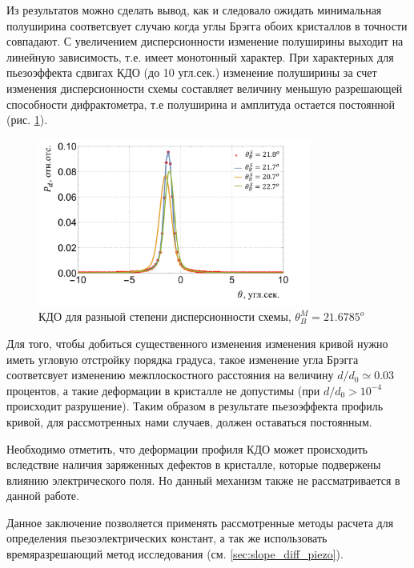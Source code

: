 Из результатов можно сделать вывод, как и следовало ожидать минимальная полуширина соответсвует
случаю когда углы Брэгга обоих кристаллов в точности совпадают. С увеличением
дисперсионности изменение полуширины выходит на линейную зависимость, т.е.
имеет монотонный характер. При характерных для пьезоэффекта сдвигах КДО (до 10 угл.сек.)
изменение полуширины за счет изменения дисперсионности схемы составляет
величину меньшую разрешающей способности дифрактометра, т.е полуширина и
амплитуда остается постоянной
 (рис. \ref{ris:FWHM_diference_bragg_KDO}).

\begin{figure}[H]
  \centering
  \includegraphics[width=0.8\textwidth]{images/FWHM_diference_bragg_KDO.png}
  \caption{КДО для разныой степени дисперсионности схемы, $\theta_B^M = 21.6785 ^o$}
  \label{ris:FWHM_diference_bragg_KDO}
\end{figure}

Для того, чтобы добиться существенного изменения изменения кривой нужно
иметь угловую отстройку порядка градуса, такое изменение угла Брэгга
соответсвует изменению межплоскостного расстояния на величину $d/d_0 \simeq 0.03$
процентов, а такие деформации в кристалле не допустимы (при $d/d_0 > 10^{-4}$ происходит разрушение).
Таким образом в результате пьезоэффекта профиль кривой, для рассмотренных нами случаев,
должен оставаться постоянным.

Необходимо отметить, что деформации профиля КДО может происходить вследствие наличия
заряженных дефектов в кристалле, которые подвержены влиянию электрического поля. Но данный механизм
также не рассматривается в данной работе.

Данное заключение позволяется применять рассмотренные методы расчета для определения пьезоэлектрических констант,
а так же использовать времяразрешающий метод исследования (см. \ref{sec:slope_diff_piezo}).
